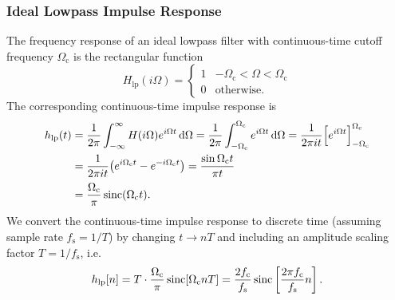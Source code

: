 \subsubsection{Ideal Lowpass Impulse Response}
The frequency response of an ideal lowpass filter with continuous-time cutoff frequency $ \Omega_{\mathrm{c}} $ is the rectangular function
\begin{equation*}
    H_{\mathrm{lp}}(i \Omega) =
    \begin{cases}
        1 & -\Omega_{\mathrm{c}} < \Omega < \Omega_{\mathrm{c}}\\
        0 & \text{otherwise}.
    \end{cases}
\end{equation*}
The corresponding continuous-time impulse response is
\begin{align*}
    h_{\mathrm{lp}}(t) & = \frac{1}{2\pi} \int_{-\infty}^{\infty} H(i \Omega) e^{i \Omega t} \mathop{}\!\mathrm{d} \Omega = \frac{1}{2\pi} \int_{-\Omega_{\mathrm{c}}}^{\Omega_{\mathrm{c}}} e^{i \Omega t} \mathop{}\!\mathrm{d} \Omega = \frac{1}{2\pi i t} \Big[ e^{i \Omega t} \Big]_{-\Omega_{\mathrm{c}}}^{\Omega_{\mathrm{c}}}\\
    & = \frac{1}{2\pi i t} \big( e^{i \Omega_{\mathrm{c}} t} - e^{-i \Omega_{\mathrm{c}} t} \big) = \frac{\sin \Omega_{\mathrm{c}} t}{\pi t}\\[0.3ex]
    & = \frac{\Omega_{\mathrm{c}}}{\pi} \operatorname{sinc} (\Omega_{\mathrm{c}} t).
\end{align*}
We convert the continuous-time impulse response to discrete time (assuming sample rate $ f_{\mathrm{s}} = 1/T $) by changing $ t \to n T $ and including an amplitude scaling factor $ T = 1/f_{\mathrm{s}} $, i.e.
\begin{equation}
    h_{\mathrm{lp}}[n] = T \cdot \frac{\Omega_{\mathrm{c}}}{\pi} \operatorname{sinc} [\Omega_{\mathrm{c}} n T] = \frac{2 f_{\mathrm{c}}}{f_{\mathrm{s}}} \operatorname{sinc} \left[ \frac{2\pi f_{\mathrm{c}}}{f_{\mathrm{s}}} n \right]. \label{eq:hlp}
\end{equation}


